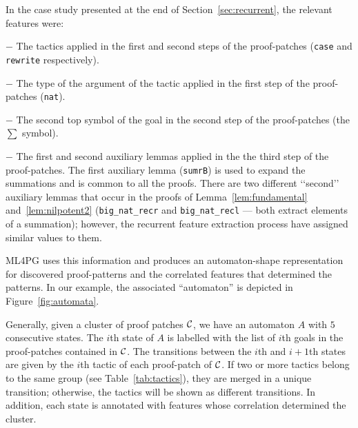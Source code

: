 \begin{example}\label{ex:correlation-features}
In the case study presented at the end of Section~\ref{sec:recurrent}, the relevant features were:

$-$ The tactics applied in the first and second steps of the proof-patches (\lstinline?case? and \lstinline?rewrite? respectively).

$-$ The type of the argument of the tactic applied in the first step of the proof-patches (\lstinline?nat?).

$-$ The second top symbol of the goal in the second step of the proof-patches (the $\sum$ symbol).

$-$ The first and second auxiliary lemmas applied in the the third step of the proof-patches. The first auxiliary lemma (\lstinline?sumrB?) is used to expand the summations and is
common to all the proofs. There are two different \lq\lq{}second\rq\rq{} auxiliary lemmas that occur in the proofs of Lemma~\ref{lem:fundamental} and~\ref{lem:nilpotent2} (\lstinline?big_nat_recr? and
\lstinline?big_nat_recl? --- both extract elements of a summation); however, the recurrent feature extraction process have assigned similar values to them.

ML4PG uses this information and produces an automaton-shape representation for discovered
proof-patterns and the correlated features that determined the patterns. In our example, the associated ``automaton'' is depicted in Figure~\ref{fig:automata}.
\end{example}

Generally, given a cluster of proof patches ${\cal C}$, we have an automaton $A$ with $5$ consecutive states. The $i$th state of $A$ is labelled
with the list of $i$th goals in the proof-patches contained in ${\cal C}$. The transitions between the $i$th and $i+1$th states are given by
the $i$th tactic of each proof-patch of ${\cal C}$. If two or more tactics belong to the same group (see Table~\ref{tab:tactics}),
they are merged in a unique transition; otherwise, the tactics will be shown as different transitions. In addition, each state is annotated with
features
whose correlation determined the cluster.

